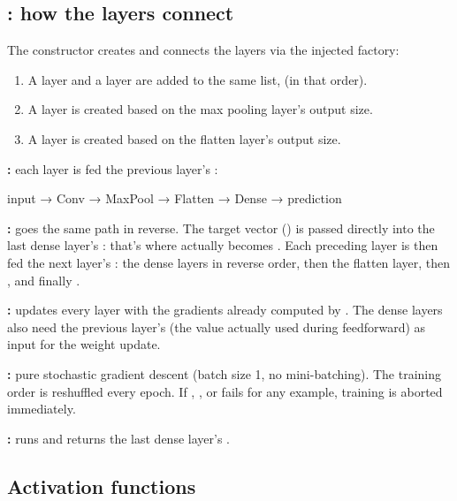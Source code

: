 \subsection{: how the layers connect}
The constructor creates and connects the layers via the injected factory:
\begin{enumerate}
  \item A  layer and a  layer are added to the same list,
     (in that order).
  \item A  layer is created based on the max pooling layer's output size.
  \item A  layer is created based on the flatten layer's output size.
\end{enumerate}

\textbf{:} each layer is fed the previous layer's :

\begin{console}
input → Conv → MaxPool → Flatten → Dense → prediction
\end{console}

\textbf{:} goes the same path in reverse. The target vector
() is passed directly into the last dense layer's : that's where
 actually becomes . Each
preceding layer is then fed the next layer's : the dense layers in reverse
order, then the flatten layer, then , and finally .

\textbf{:} updates every layer with the gradients already computed by
. The dense layers also need the previous layer's  (the value
actually used during feedforward) as input for the weight update.

\textbf{:} pure stochastic gradient
descent (batch size 1, no mini-batching). The training order is reshuffled every epoch. If
, , or  fails for any example, training
is aborted immediately.

\textbf{:} runs  and returns the last dense layer's
.

\subsection{Activation functions}

